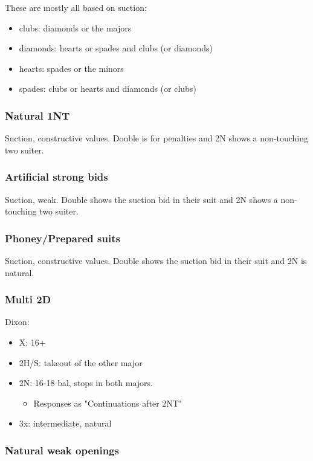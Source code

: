 \documentclass[a4paper,12pt]{article}
\begin{document}
These are mostly all based on suction:

\begin{itemize}
\item clubs: diamonds or the majors
\item diamonds: hearts or spades and clubs (or diamonds)
\item hearts: spades or the minors
\item spades: clubs or hearts and diamonds (or clubs)
\end{itemize}

\subsubsection{Natural 1NT}

Suction, constructive values. Double is for penalties and 2N shows a
non-touching two suiter.

\subsubsection{Artificial strong bids}

Suction, weak. Double shows the suction bid in their suit and 2N shows a
non-touching two suiter.

\subsubsection{Phoney/Prepared suits}

Suction, constructive values. Double shows the suction bid in their suit and 2N
is natural.

\subsubsection{Multi 2D}

Dixon:

\begin{itemize}
\item X: 16+
\item 2H/S: takeout of the other major
\item 2N: 16-18 bal, stops in both majors.
	\begin{itemize}
	\item Responses as "Continuations after 2NT"
	\end{itemize}
\item 3x: intermediate, natural
\end{itemize}

\subsubsection{Natural weak openings}
\end{document}
